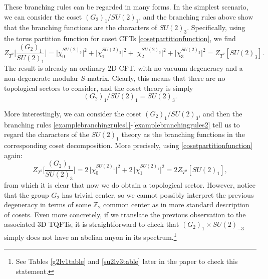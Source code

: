 \documentclass[11pt]{article}
\numberwithin{equation}{section}
\begin{document}
These branching rules can be regarded in many forms. In the simplest scenario, we can consider the coset $(G_{2})_{1}/SU(2)_{1}$, and the branching rules above show that the branching functions are the characters of $SU(2)_{3}$. Specifically, using the torus partition function for coset CFTs \eqref{cosetpartitionfunction}, we find
\begin{equation} \label{firstcoset}
    Z_{T^{2}}\bigg[ \frac{(G_{2})_{1}}{SU(2)_{1}} \bigg] = \big| \chi^{SU(2)_{3}}_{0} \big|^{2} + \big| \chi^{SU(2)_{3}}_{1} \big|^{2} + \big| \chi^{SU(2)_{3}}_{2} \big|^{2} + \big| \chi^{SU(2)_{3}}_{3} \big|^{2} = Z_{T^{2}}[SU(2)_{3}].
\end{equation}
The result is already an ordinary 2D CFT, with no vacuum degeneracy and a non-degenerate modular $S$-matrix. Clearly, this means that there are no topological sectors to consider, and the coset theory is simply
\begin{equation}
    (G_{2})_{1}/SU(2)_{1} = SU(2)_{3}. \label{firstcosettheory}
\end{equation}

More interestingly, we can consider the coset $(G_{2})_{1}/SU(2)_{3}$, and then the branching rules \eqref{examplebranchingrules1}-\eqref{examplebranchingrules2} tell us to regard the characters of the $SU(2)_{1}$ theory as the branching functions in the corresponding coset decomposition. More precisely, using \eqref{cosetpartitionfunction} again:
\begin{equation} \label{secondcoset}
    Z_{T^{2}}\bigg[ \frac{(G_{2})_{1}}{SU(2)_{3}} \bigg] = 2 \, \big|\chi^{SU(2)_{1}}_{0} \big|^{2} + 2 \, \big| \chi^{SU(2)_{1}}_{1} \big|^{2} = 2 Z_{T^{2}}[SU(2)_{1}],
\end{equation}
from which it is clear that now we do obtain a topological sector. However, notice that the group $G_{2}$ has trivial center, so we cannot possibly interpret the previous degeneracy in terms of some $\mathbb{Z}_{2}$ common center as in more standard description of cosets. Even more concretely, if we translate the previous observation to the associated 3D TQFTs, it is straightforward to check that $(G_{2})_{1} \times SU(2)_{-3}$ simply does not have an abelian anyon in its spectrum.\footnote{See Tables \ref{g2lv1table} and \ref{su2lv3table} later in the paper to check this statement.} 
\end{document}
